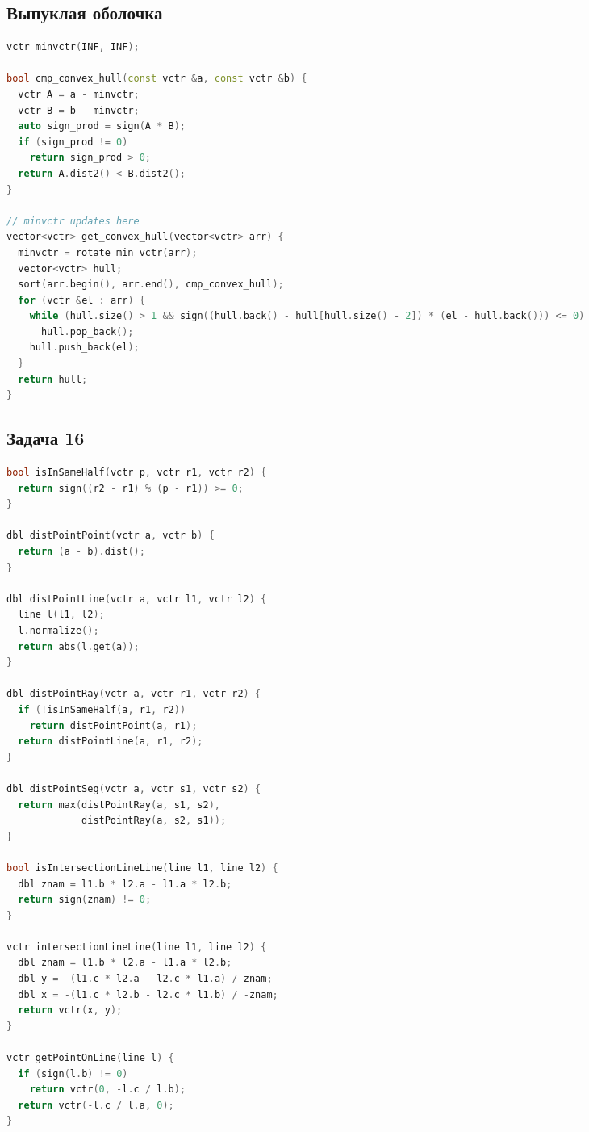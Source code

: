\documentclass[10pt,a4paper,landscape,twosided]{extarticle}
\begin{document}
\begin{multicols*}{3}
\begin{lstlisting}[language=C++]
\end{lstlisting}

\subsection{Выпуклая оболочка}
\begin{lstlisting}[language=C++]
vctr minvctr(INF, INF);

bool cmp_convex_hull(const vctr &a, const vctr &b) {
  vctr A = a - minvctr;
  vctr B = b - minvctr;
  auto sign_prod = sign(A * B);
  if (sign_prod != 0)
    return sign_prod > 0;
  return A.dist2() < B.dist2();
}

// minvctr updates here
vector<vctr> get_convex_hull(vector<vctr> arr) {
  minvctr = rotate_min_vctr(arr);
  vector<vctr> hull;
  sort(arr.begin(), arr.end(), cmp_convex_hull);
  for (vctr &el : arr) {
    while (hull.size() > 1 && sign((hull.back() - hull[hull.size() - 2]) * (el - hull.back())) <= 0)
      hull.pop_back();
    hull.push_back(el);
  }
  return hull;
}

\end{lstlisting}

\subsection{Задача 16}
\begin{lstlisting}[language=C++]
bool isInSameHalf(vctr p, vctr r1, vctr r2) {
  return sign((r2 - r1) % (p - r1)) >= 0;
}

dbl distPointPoint(vctr a, vctr b) {
  return (a - b).dist();
}

dbl distPointLine(vctr a, vctr l1, vctr l2) {
  line l(l1, l2);
  l.normalize();
  return abs(l.get(a));
}

dbl distPointRay(vctr a, vctr r1, vctr r2) {
  if (!isInSameHalf(a, r1, r2))
    return distPointPoint(a, r1);
  return distPointLine(a, r1, r2);
}

dbl distPointSeg(vctr a, vctr s1, vctr s2) {
  return max(distPointRay(a, s1, s2),
             distPointRay(a, s2, s1));
}

bool isIntersectionLineLine(line l1, line l2) {
  dbl znam = l1.b * l2.a - l1.a * l2.b;
  return sign(znam) != 0;
}

vctr intersectionLineLine(line l1, line l2) {
  dbl znam = l1.b * l2.a - l1.a * l2.b;
  dbl y = -(l1.c * l2.a - l2.c * l1.a) / znam;
  dbl x = -(l1.c * l2.b - l2.c * l1.b) / -znam;
  return vctr(x, y);
}

vctr getPointOnLine(line l) {
  if (sign(l.b) != 0)
    return vctr(0, -l.c / l.b);
  return vctr(-l.c / l.a, 0);
}


\end{lstlisting}
\end{multicols*}
\end{document}
